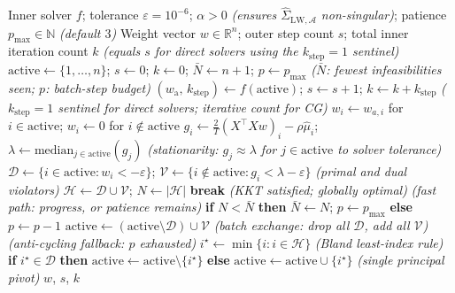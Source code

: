 \begin{algorithm}[ht]
\caption{Active-set outer loop (wraps any inner solver $f$)}\label{alg:elim}
\begin{algorithmic}[1]
\Require Inner solver $f$;\; tolerance $\varepsilon = 10^{-6}$;\; $\alpha > 0$
  \hfill\textit{(ensures $\hat\Sigma_{\mathrm{LW},\mathcal{A}}$ non-singular)};\; patience $p_{\max} \in \mathbb{N}$ \textit{(default $3$)}
\Ensure Weight vector $w \in \mathbb{R}^n$;\; outer step count $s$;\; total inner iteration count $k$ \textit{(equals $s$ for direct solvers using the $k_{\mathrm{step}}=1$ sentinel)}
\State $\mathrm{active} \leftarrow \{1,\ldots,n\}$;\; $s \leftarrow 0$;\; $k \leftarrow 0$;\; $\bar N \leftarrow n+1$;\; $p \leftarrow p_{\max}$
  \hfill\textit{($\bar N$: fewest infeasibilities seen; $p$: batch-step budget)}
\Loop
  \State $(w_{\mathrm{a}},\, k_{\mathrm{step}}) \leftarrow f(\mathrm{active})$;\; $s \leftarrow s + 1$;\; $k \leftarrow k + k_{\mathrm{step}}$
    \hfill\textit{($k_{\mathrm{step}} = 1$ sentinel for direct solvers; iterative count for CG)}
  \State $w_i \leftarrow w_{a,i}$ for $i \in \mathrm{active}$;\; $w_i \leftarrow 0$ for $i \notin \mathrm{active}$
  \State $g_i \leftarrow \tfrac{2}{T}(X^\top Xw)_i - \rho\hat\mu_i$;\;
         $\lambda \leftarrow \mathrm{median}_{j \in \mathrm{active}}(g_j)$
    \hfill\textit{(stationarity: $g_j \approx \lambda$ for $j \in \mathrm{active}$ to solver tolerance)}
  \State $\mathcal{D} \leftarrow \{i \in \mathrm{active} : w_i < -\varepsilon\}$;\;
         $\mathcal{V} \leftarrow \{i \notin \mathrm{active} : g_i < \lambda - \varepsilon\}$
    \hfill\textit{(primal and dual violators)}
  \State $\mathcal{H} \leftarrow \mathcal{D} \cup \mathcal{V}$;\; $N \leftarrow |\mathcal{H}|$
    \State \textbf{break} \hfill\textit{(KKT satisfied; globally optimal)}
    \hfill\textit{(fast path: progress, or patience remains)}
    \State \textbf{if} $N < \bar N$ \textbf{ then } $\bar N \leftarrow N$;\; $p \leftarrow p_{\max}$ \textbf{ else } $p \leftarrow p - 1$
    \State $\mathrm{active} \leftarrow (\mathrm{active} \setminus \mathcal{D}) \cup \mathcal{V}$
      \hfill\textit{(batch exchange: drop all $\mathcal{D}$, add all $\mathcal{V}$)}
  \Else
    \hfill\textit{(anti-cycling fallback: $p$ exhausted)}
    \State $i^\star \leftarrow \min\{i : i \in \mathcal{H}\}$
      \hfill\textit{(Bland least-index rule)}
    \State \textbf{if} $i^\star \in \mathcal{D}$ \textbf{ then } $\mathrm{active} \leftarrow \mathrm{active} \setminus \{i^\star\}$
           \textbf{ else } $\mathrm{active} \leftarrow \mathrm{active} \cup \{i^\star\}$
      \hfill\textit{(single principal pivot)}
  \EndIf
\EndLoop
\State \Return $w$, $s$, $k$
\end{algorithmic}
\end{algorithm}

